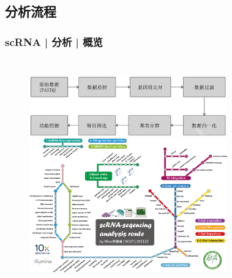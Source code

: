 \documentclass[11pt]{ctexbeamer}
\begin{document}
\subsection{分析流程}
\begin{frame}
  \frametitle{scRNA | 分析 | 概览}
  \begin{columns}
   \begin{figure}
    \centering
    \includegraphics[width=\textwidth]{scRNA_analysis_workflow_01.png}\\ \vspace{0.5em}
     \includegraphics[width=\textwidth]{scRNA_route.png}
  \end{figure}
         \begin{figure}
    \centering

\end{figure}
\end{columns}
\end{frame}
\end{document}
